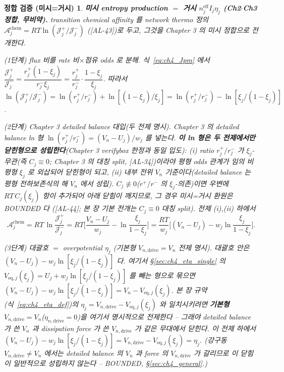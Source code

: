 \documentclass[11pt,a4paper]{article}
\newtheorem*{verifybox}{정합 검증 (미시=거시)}
\newcommand{\eff}{\mathrm{eff}}
\newcommand{\eq}{\mathrm{eq}}
\newcommand{\drive}{\mathrm{drive}}
\newcommand{\chem}{\mathrm{chem}}
\newcommand{\AL}[1]{\textsf{[AL-#1]}}
\begin{document}
\begin{verifybox}
\textbf{미시 entropy production $=$ 거시 $n_j^{\eff}I_j\eta_j$ (Ch2$\cdot$Ch3 정합, 무비약).}
transition chemical affinity 를 network thermo 정의 $\mathcal A_j^{\chem}=RT\ln(\mathcal J_j^+/\mathcal J_j^-)$
(\AL{43})로 두고, 그것을 Chapter 3 의 미시 정합으로 전개한다.

\emph{(1단계) flux 비를 rate 비$\times$점유 odds 로 분해.} 식~\eqref{eq:ch4_Jpm} 에서
$\dfrac{\mathcal J_j^+}{\mathcal J_j^-}=\dfrac{r_j^+(1-\xi_j)}{r_j^-\xi_j}=\dfrac{r_j^+}{r_j^-}\cdot\dfrac{1-\xi_j}{\xi_j}$.
따라서 $\ln(\mathcal J_j^+/\mathcal J_j^-)=\ln(r_j^+/r_j^-)+\ln[(1-\xi_j)/\xi_j]=\ln(r_j^+/r_j^-)-\ln[\xi_j/(1-\xi_j)]$.

\emph{(2단계) Chapter 3 detailed balance 대입(두 전제 명시).} Chapter 3 의 detailed balance ln 형
$\ln(r_j^+/r_j^-)=(V_n-U_j)/w_j$ 를 넣는다. \textbf{이 ln 형은 두 전제에서만 닫힌형으로 성립한다}(Chapter 3
verifybox 한정과 \emph{동일 입도}): (i) ratio $r_j^+/r_j^-$ 가 $\xi_j$\emph{-무관}(즉 $C_j\equiv0$; Chapter 3 의
대칭 split, \AL{34})이라야 \emph{평형} odds 관계가 임의 \emph{비평형} $\xi_j$ 로 외삽되어 닫힌형이 되고, (ii)
\emph{내부 전위} $V_n$ 기준이다(detailed balance 는 평형 전하보존식의 해 $V_n$ 에서 성립). $C_j\not\equiv0$($r^+/r^-$
의 $\xi_j$-의존)이면 우변에 $RT\,C_j(\xi_j)$ 항이 추가되어 아래 닫힘이 깨지므로, 그 경우 미시=거시 환원은 BOUNDED 다
(\AL{44}; 본 장 기본 전개는 $C_j\equiv0$ 대칭 split). 전제 (i),(ii) 하에서
\begin{equation}
\mathcal A_j^{\chem}=RT\,\ln\!\frac{\mathcal J_j^+}{\mathcal J_j^-}
=RT\Big[\frac{V_n-U_j}{w_j}-\ln\frac{\xi_j}{1-\xi_j}\Big]
=\frac{RT}{w_j}\Big[(V_n-U_j)-w_j\ln\frac{\xi_j}{1-\xi_j}\Big].
\label{eq:ch4_affinity_raw}
\end{equation}

\emph{(3단계) 대괄호 $=$ overpotential $\eta_j$ (기본형 $V_{n,\drive}=V_n$ 전제 명시).}
대괄호 안은 $(V_n-U_j)-w_j\ln[\xi_j/(1-\xi_j)]$ 다. 여기서 \S\ref{sec:ch4_eta_single} 의 $V_{\eq,j}(\xi_j)=U_j
+w_j\ln[\xi_j/(1-\xi_j)]$ 를 빼는 형으로 묶으면 $(V_n-U_j)-w_j\ln[\xi_j/(1-\xi_j)]=V_n-V_{\eq,j}(\xi_j)$. 본 장
규약(식~\eqref{eq:ch4_eta_def})의 $\eta_j=V_{n,\drive}-V_{\eq,j}(\xi_j)$ 와 일치시키려면 \textbf{기본형
$V_{n,\drive}=V_n$}($\eta_{n,\drive}=0$)을 \emph{여기서 명시적으로 전제}한다 -- 그래야
detailed balance 가 쓴 $V_n$ 과 dissipation force 가 쓴 $V_{n,\drive}$ 가 같은 무대에서 닫힌다. 이 전제 하에서
$(V_n-U_j)-w_j\ln[\xi_j/(1-\xi_j)]=V_{n,\drive}-V_{\eq,j}(\xi_j)=\eta_j$. (강구동 $V_{n,\drive}\ne V_n$ 에서는
detailed balance 의 $V_n$ 과 force 의 $V_{n,\drive}$ 가 갈리므로 이 닫힘이 일반적으로 성립하지 않는다 --
BOUNDED, \S\ref{sec:ch4_general}.)


\end{verifybox}
\end{document}

